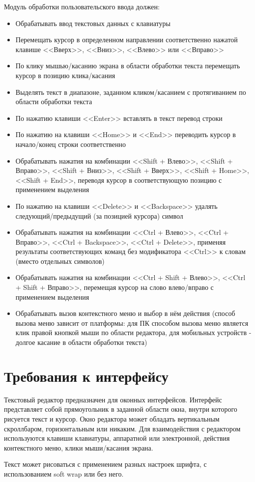\documentclass{fefu}
\begin{document}
		\par Модуль обработки пользовательского ввода должен:
		\begin{itemize}
			\item Обрабатывать ввод текстовых данных с клавиатуры
			\item Перемещать курсор в определенном направлении соответственно нажатой 
			клавише <<Вверх>>, <<Вниз>>, <<Влево>> или <<Вправо>>
			\item По клику мышью/касанию экрана в области обработки текста перемещать курсор
			в позицию клика/касания
			\item Выделять текст в диапазоне, заданном кликом/касанием с протягиванием по
			области обработки текста
			\item По нажатию клавиши <<Enter>> вставлять в текст перевод строки
			\item По нажатию на клавиши <<Home>> и <<End>> переводить курсор в начало/конец строки
			соответственно
			\item Обрабатывать нажатия на комбинации <<Shift + Влево>>, <<Shift + Вправо>>, 
			<<Shift + Вниз>>, <<Shift + Вверх>>, <<Shift + Home>>, <<Shift + End>>, переводя курсор
			в соответствующую позицию с применением выделения
			\item По нажатию на клавиши <<Delete>> и <<Backspace>> удалять следующий/предыдущий
			(за позицией курсора) символ
			\item Обрабатывать нажатия на комбинации <<Ctrl + Влево>>, <<Ctrl + Вправо>>, 
			<<Ctrl + Backspace>>, <<Ctrl + Delete>>, применяя результаты соответствующих команд без
			модификатора <<Ctrl>> к словам (вместо отдельных символов)
			\item Обрабатывать нажатия на комбинации <<Ctrl + Shift + Влево>>, 
			<<Ctrl + Shift + Вправо>>, перемещая курсор на слово влево/вправо с применением
			выделения
			\item Обрабатывать вызов контекстного меню и выбор в нём действия (способ вызова
			меню зависит от платформы: для ПК способом вызова меню является клик правой
			кнопкой мыши по области редактора, для мобильных устройств - долгое касание в 
			области обработки текста)
		\end{itemize}
	\section{Требования к интерфейсу}
		\par Текстовый редактор предназначен для оконных интерфейсов. Интерфейс представляет
		собой прямоугольник в заданной области окна, внутри которого рисуется текст и курсор. Окно редактора может обладать 
		вертикальным скроллбаром, горизонтальным или никаким. Для взаимодействия с редактором
		используются клавиши клавиатуры, 
		аппаратной или электронной, действия контекстного меню, клики мыши/касания экрана.
		\par Текст может рисоваться с применением разных настроек шрифта, с использованием soft
		wrap или без него.
\end{document}
